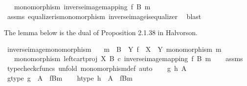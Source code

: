\begin{isabellebody}
\ \ \ {\isachardoublequoteopen}monomorphism\ {\isacharparenleft}{\kern0pt}inverse{\isacharunderscore}{\kern0pt}image{\isacharunderscore}{\kern0pt}mapping\ f\ B\ m{\isacharparenright}{\kern0pt}{\isachardoublequoteclose}\isanewline
%
\isadelimproof
\ \ %
\endisadelimproof
%
\isatagproof
{}\isamarkupfalse%
\ assms\ equalizer{\isacharunderscore}{\kern0pt}is{\isacharunderscore}{\kern0pt}monomorphism\ inverse{\isacharunderscore}{\kern0pt}image{\isacharunderscore}{\kern0pt}is{\isacharunderscore}{\kern0pt}equalizer{}\ \isamarkupfalse%
\ blast%
\endisatagproof
{\isafoldproof}%
%
\isadelimproof
%
\endisadelimproof
%
\begin{isamarkuptext}%
The lemma below is the dual of Proposition 2.1.38 in Halvorson.%
\end{isamarkuptext}\isamarkuptrue%
\isamarkupfalse%
\ inverse{\isacharunderscore}{\kern0pt}image{\isacharunderscore}{\kern0pt}monomorphism{\isacharcolon}{\kern0pt}\isanewline
\ \ \ {\isachardoublequoteopen}m\ {\isacharcolon}{\kern0pt}\ B\ {\isasymrightarrow}\ Y{\isachardoublequoteclose}\ {\isachardoublequoteopen}f\ {\isacharcolon}{\kern0pt}\ X\ {\isasymrightarrow}\ Y{\isachardoublequoteclose}\ {\isachardoublequoteopen}monomorphism\ m{\isachardoublequoteclose}\isanewline
\ \ \ {\isachardoublequoteopen}monomorphism\ {\isacharparenleft}{\kern0pt}left{\isacharunderscore}{\kern0pt}cart{\isacharunderscore}{\kern0pt}proj\ X\ B\ {\isasymcirc}\isactrlsub c\ inverse{\isacharunderscore}{\kern0pt}image{\isacharunderscore}{\kern0pt}mapping\ f\ B\ m{\isacharparenright}{\kern0pt}{\isachardoublequoteclose}\isanewline
%
\isadelimproof
\ \ %
\endisadelimproof
%
\isatagproof
{}\isamarkupfalse%
\ assms\isanewline
{}\isamarkupfalse%
\ {\isacharparenleft}{\kern0pt}typecheck{\isacharunderscore}{\kern0pt}cfuncs{\isacharcomma}{\kern0pt}\ unfold\ monomorphism{\isacharunderscore}{\kern0pt}def{}{\isacharcomma}{\kern0pt}\ auto{\isacharparenright}{\kern0pt}\isanewline
\ \ \isamarkupfalse%
\ g\ h\ A\isanewline
\ \ \isamarkupfalse%
\ g{\isacharunderscore}{\kern0pt}type{\isacharcolon}{\kern0pt}\ {\isachardoublequoteopen}g\ {\isacharcolon}{\kern0pt}\ A\ {\isasymrightarrow}\ {\isacharparenleft}{\kern0pt}f\isactrlsup {\isacharminus}{\kern0pt}B{\isasymrparr}\isactrlbsub m\isactrlesub {\isacharparenright}{\kern0pt}{\isachardoublequoteclose}\isanewline
\ \ \isamarkupfalse%
\ h{\isacharunderscore}{\kern0pt}type{\isacharcolon}{\kern0pt}\ {\isachardoublequoteopen}h\ {\isacharcolon}{\kern0pt}\ A\ {\isasymrightarrow}\ {\isacharparenleft}{\kern0pt}f\isactrlsup {\isacharminus}{\kern0pt}B{\isasymrparr}\isactrlbsub m\isactrlesub {\isacharparenright}{\kern0pt}{\isachardoublequoteclose}\isanewline

\end{isabellebody}

